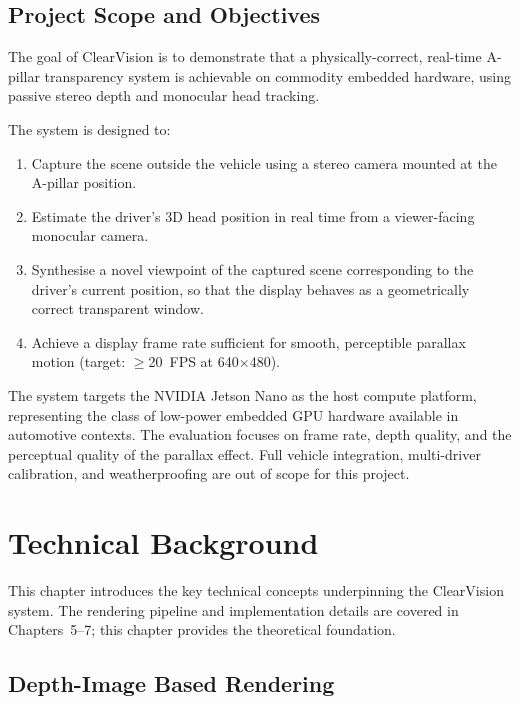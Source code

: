 \documentclass[11pt, a4paper]{report}
\begin{document}
\section{Project Scope and Objectives}

The goal of ClearVision is to demonstrate that a physically-correct,
real-time A-pillar transparency system is achievable on commodity embedded
hardware, using passive stereo depth and monocular head tracking.

The system is designed to:

\begin{enumerate}[noitemsep]
    \item Capture the scene outside the vehicle using a stereo camera
          mounted at the A-pillar position.
    \item Estimate the driver's 3D head position in real time from a
          viewer-facing monocular camera.
    \item Synthesise a novel viewpoint of the captured scene corresponding
          to the driver's current position, so that the display behaves as
          a geometrically correct transparent window.
    \item Achieve a display frame rate sufficient for smooth, perceptible
          parallax motion (target: $\geq$20~FPS at 640$\times$480).
\end{enumerate}

The system targets the NVIDIA Jetson Nano as the host compute platform,
representing the class of low-power embedded GPU hardware available in
automotive contexts.
The evaluation focuses on frame rate, depth quality, and the perceptual
quality of the parallax effect.
Full vehicle integration, multi-driver calibration, and weatherproofing
are out of scope for this project.

\chapter{Technical Background}

This chapter introduces the key technical concepts underpinning the
ClearVision system.
The rendering pipeline and implementation details are covered in
Chapters~5--7; this chapter provides the theoretical foundation.

\section{Depth-Image Based Rendering}
\label{sec:dibr}
\end{document}
